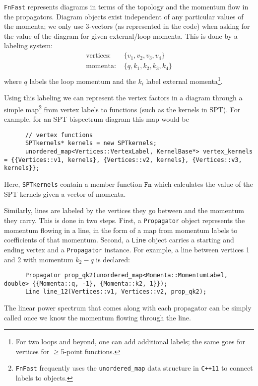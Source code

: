 \documentclass[12pt]{article}
\newcommand{\fnfast}{\texttt{FnFast}\xspace}
\newcommand{\nn}{\nonumber}
\begin{document}
\fnfast represents diagrams in terms of the topology and the momentum flow in the propagators.  Diagram objects exist independent of any particular values of the momenta; we only use 3-vectors (as represented in the code) when asking for the value of the diagram for given external/loop momenta.  This is done by a labeling system:
\begin{align}
\text{vertices: }& \{v_1, v_2, v_3, v_4\} \nn \\
\text{momenta: }& \{q, k_1, k_2, k_3, k_4\} \nn \\
\end{align}
where $q$ labels the loop momentum and the $k_i$ label external momenta\footnote{For two loops and beyond, one can add additional labels; the same goes for vertices for $\ge$5-point functions.}.

Using this labeling we can represent the vertex factors in a diagram through a simple map\footnote{\fnfast frequently uses the \texttt{unordered\_map} data structure in \texttt{C++11} to connect labels to objects.}  from vertex labels to functions (such as the kernels in SPT).  For example, for an SPT bispectrum diagram this map would be
\begin{lstlisting}
      // vertex functions
      SPTkernels* kernels = new SPTkernels;
      unordered_map<Vertices::VertexLabel, KernelBase*> vertex_kernels = {{Vertices::v1, kernels}, {Vertices::v2, kernels}, {Vertices::v3, kernels}};
\end{lstlisting}
Here, \texttt{SPTkernels} contain a member function $\texttt{Fn}$ which calculates the value of the SPT kernels given a vector of momenta.

Similarly, lines are labeled by the vertices they go between and the momentum they carry.  This is done in two steps.  First, a \texttt{Propagator} object represents the momentum flowing in a line, in the form of a map from momentum labels to coefficients of that momentum.  Second, a \texttt{Line} object carries a starting and ending vertex and a \texttt{Propagator} instance.  For example, a line between vertices 1 and 2 with momentum $k_2 - q$ is declared:
\begin{lstlisting}
      Propagator prop_qk2(unordered_map<Momenta::MomentumLabel, double> {{Momenta::q, -1}, {Momenta::k2, 1}});
      Line line_12(Vertices::v1, Vertices::v2, prop_qk2);
\end{lstlisting}
The linear power spectrum that comes along with each propagator can be simply called once we know the momentum flowing through the line.
\end{document}
